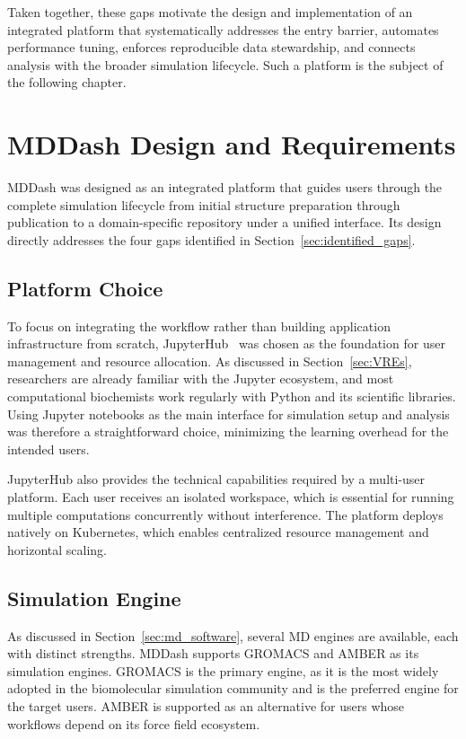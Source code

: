 \documentclass[
  digital,     %
  color,       %
  oneside,     %
  nosansbold,  %
  nocolorbold, %
  lof,         %
  lot,         %
]{fithesis4}
\begin{document}
Taken together, these gaps motivate the design and implementation of an integrated platform that systematically addresses the entry barrier, automates performance tuning, enforces reproducible data stewardship, and connects analysis with the broader simulation lifecycle. Such a platform is the subject of the following chapter.


\chapter{MDDash Design and Requirements}
\label{ch:mddash_design}

MDDash was designed as an integrated platform that guides users through the complete simulation lifecycle from initial structure preparation through publication to a domain-specific repository under a unified interface. Its design directly addresses the four gaps identified in Section~\ref{sec:identified_gaps}.

\section{Platform Choice}

To focus on integrating the workflow rather than building application infrastructure from scratch, JupyterHub~\cite{jupyter} was chosen as the foundation for user management and resource allocation. As discussed in Section~\ref{sec:VREs}, researchers are already familiar with the Jupyter ecosystem, and most computational biochemists work regularly with Python and its scientific libraries. Using Jupyter notebooks as the main interface for simulation setup and analysis was therefore a straightforward choice, minimizing the learning overhead for the intended users.

JupyterHub also provides the technical capabilities required by a multi-user platform. Each user receives an isolated workspace, which is essential for running multiple computations concurrently without interference. The platform deploys natively on Kubernetes, which enables centralized resource management and horizontal scaling.

\section{Simulation Engine}

As discussed in Section~\ref{sec:md_software}, several MD engines are available, each with distinct strengths. MDDash supports GROMACS and AMBER as its simulation engines. GROMACS is the primary engine, as it is the most widely adopted in the biomolecular simulation community and is the preferred engine for the target users. AMBER is supported as an alternative for users whose workflows depend on its force field ecosystem.
\end{document}
